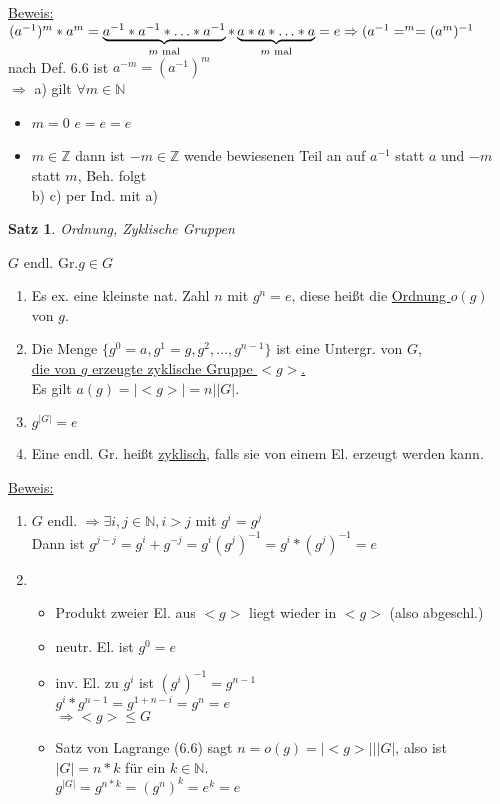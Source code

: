\documentclass[a4paper,11pt]{article}
\newtheorem{satz}[definition]{Satz}
\newcommand{\hsp}{\hspace{5mm}}
\begin{document}
\underline{Beweis:} \\
$(a^{-1})^m*a^m=\underbrace{a^{-1}*a^{-1}*\hdots*a^{-1}}_{m\text{ mal}}*\underbrace{a*a*\hdots*a}_{m\text{ mal}}=e \\
\Rightarrow (a^{-1}=^m=(a^m)^{-1}$ \\
nach Def. 6.6 ist $a^{-m}=(a^{-1})^m$ \\
$\Rightarrow$ a) gilt $\forall m\in\mathbb{N}$ \\
\begin{itemize}
	\item\underline{$m=0$} $e=e=e$ 
	\item\underline{$m\in\mathbb{Z}$} dann ist $-m\in\mathbb{Z}$ wende bewiesenen Teil an auf $a^{-1}$ statt $a$ und $-m$ statt $m$, Beh. folgt \\
	b) c) per Ind. mit a)
\end{itemize}

\begin{satz}
	Ordnung, Zyklische Gruppen
\end{satz}
$G$ endl. Gr.\hsp $g\in G$
\begin{enumerate}[label=\alph*)]
	\item Es ex. eine kleinste nat. Zahl $n$ mit $g^n=e$, diese heißt die \underline{Ordnung $o(g)$} von $g$.
	\item Die Menge $\{g^0=a,g^1=g,g^2,\hdots,g^{n-1}\}$ ist eine Untergr. von $G$, \\
	\underline{die von $g$ erzeugte zyklische Gruppe $<g>$.} \\
	Es gilt $a(g)=\vert<g>\vert=n\mid\vert G\vert$.
	\item $g^{\vert G\vert}=e$ 
	\item Eine endl. Gr. heißt \underline{zyklisch}, falls sie von einem El. erzeugt werden kann.
\end{enumerate}

\underline{Beweis:}
\begin{enumerate}[label=\alph*)]
	\item $G$ endl. $\Rightarrow\exists i,j\in\mathbb{N},i>j$ mit \underline{$g^i=g^j$} \\
	Dann ist $g^{j-j}=g^i+g^{-j}=g^i(g^j)^{-1}=g^i*(g^j)^{-1}=e$
	\item\begin{itemize} 
		\item Produkt zweier El. aus $<g>$ liegt wieder in $<g>$ (also abgeschl.)
		\item neutr. El. ist $g^0=e$
		\item inv. El. zu $g^i$ ist $(g^i)^{-1}=g^{n-1}$ \\
		$g^i*g^{n-1}=g^{1+n-i}=g^n=e$ \\
		$\Rightarrow <g>\leq G$
		\item Satz von Lagrange (6.6) sagt $n=o(g)=\vert<g>\vert\mid\vert G\vert$, also ist $\vert G\vert=n*k$ für ein $k\in\mathbb{N}$. \\
		$g^{\vert G\vert}=g^{n*k}=(g^n)^k=e^k=e$
	\end{itemize}
\end{enumerate}
\end{document}
